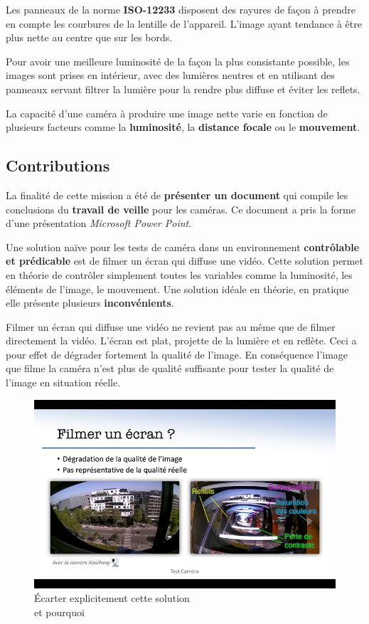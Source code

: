   Les panneaux de la norme \textbf{ISO-12233} disposent des rayures de façon à prendre en compte les courbures de la lentille de l'appareil. L'image ayant tendance à être plus nette au centre que sur les bords.
  
  Pour avoir une meilleure luminosité de la façon la plus consistante possible, les images sont prises en intérieur, avec des lumières neutres et en utilisant des panneaux servant filtrer la lumière pour la rendre plus diffuse et éviter les reflets.
  
  La capacité d'une caméra à produire une image nette varie en fonction de plusieurs facteurs comme la \textbf{luminosité}, la \textbf{distance focale} ou le \textbf{mouvement}. 
  
  \subsection{Contributions}
  La finalité de cette mission a été de \textbf{présenter un document} qui compile les conclusions du \textbf{travail de veille} pour les caméras. Ce document a pris la forme d'une présentation \textit{Microsoft Power Point}.
  
  Une solution naïve pour les tests de caméra dans un environnement \textbf{contrôlable et prédicable} est de filmer un écran qui diffuse une vidéo. Cette solution permet en théorie de contrôler simplement toutes les variables comme la luminosité, les éléments de l'image, le mouvement. Une solution idéale en théorie, en pratique elle présente plusieurs \textbf{inconvénients}.
  
  Filmer un écran qui diffuse une vidéo ne revient pas au même que de filmer directement la vidéo. L'écran est plat, projette de la lumière et en reflète. Ceci a pour effet de dégrader fortement la qualité de l'image. En conséquence l'image que filme la caméra n'est plus de qualité suffisante pour tester la qualité de l'image en situation réelle.
  
	\begin{figure}[H]
      \centering
      \includegraphics[width=12cm]{img/CamTestEcran.png}
      \caption{Écarter explicitement cette solution\\et pourquoi}
	\end{figure}
  
